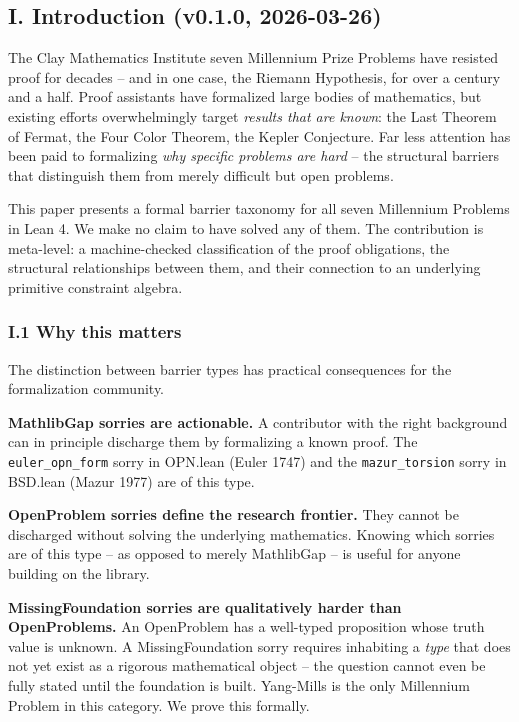\documentclass[12pt,a4paper]{article}
\begin{document}
\subsection{I. Introduction (v0.1.0, 2026-03-26)}

The Clay Mathematics Institute seven Millennium Prize Problems have resisted proof for decades  --  and in one case, the Riemann Hypothesis, for over a century and a half. Proof assistants have formalized large bodies of mathematics, but existing efforts overwhelmingly target \emph{results that are known}: the Last Theorem of Fermat, the Four Color Theorem, the Kepler Conjecture. Far less attention has been paid to formalizing \emph{why specific problems are hard}  --  the structural barriers that distinguish them from merely difficult but open problems.

This paper presents a formal barrier taxonomy for all seven Millennium Problems in Lean 4. We make no claim to have solved any of them. The contribution is meta-level: a machine-checked classification of the proof obligations, the structural relationships between them, and their connection to an underlying primitive constraint algebra.

\subsubsection{I.1 Why this matters}

The distinction between barrier types has practical consequences for the formalization community.

\textbf{MathlibGap sorries are actionable.} A contributor with the right background can in principle discharge them by formalizing a known proof. The \texttt{euler\_opn\_form} sorry in OPN.lean (Euler 1747) and the \texttt{mazur\_torsion} sorry in BSD.lean (Mazur 1977) are of this type.

\textbf{OpenProblem sorries define the research frontier.} They cannot be discharged without solving the underlying mathematics. Knowing which sorries are of this type  --  as opposed to merely MathlibGap  --  is useful for anyone building on the library.

\textbf{MissingFoundation sorries are qualitatively harder than OpenProblems.} An OpenProblem has a well-typed proposition whose truth value is unknown. A MissingFoundation sorry requires inhabiting a \emph{type} that does not yet exist as a rigorous mathematical object  --  the question cannot even be fully stated until the foundation is built. Yang-Mills is the only Millennium Problem in this category. We prove this formally.
\end{document}
